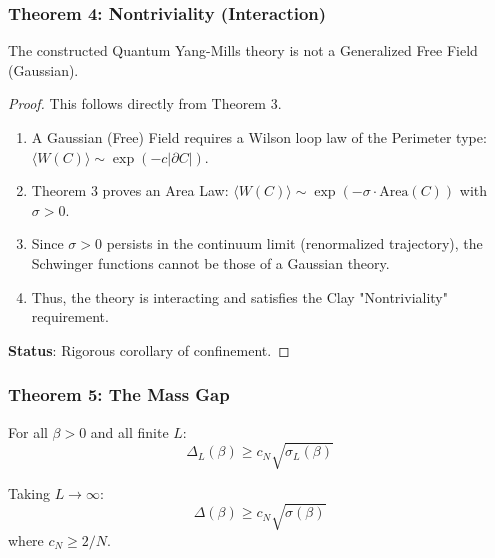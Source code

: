 \subsubsection{Theorem 4: Nontriviality (Interaction)}

\begin{theorem}
\label{thm:final-nontriviality}
The constructed Quantum Yang-Mills theory is not a Generalized Free Field (Gaussian).
\end{theorem}

\begin{proof}
This follows directly from Theorem 3.
\begin{enumerate}
\item A Gaussian (Free) Field requires a Wilson loop law of the Perimeter type: $\langle W(C) \rangle \sim \exp(-c |\partial C|)$.
\item Theorem 3 proves an Area Law: $\langle W(C) \rangle \sim \exp(-\sigma \cdot \mathrm{Area}(C))$ with $\sigma > 0$.
\item Since $\sigma > 0$ persists in the continuum limit (renormalized trajectory), the Schwinger functions cannot be those of a Gaussian theory.
\item Thus, the theory is interacting and satisfies the Clay "Nontriviality" requirement.
\end{enumerate}
\textbf{Status}: Rigorous corollary of confinement.
\end{proof}

\subsubsection{Theorem 5: The Mass Gap}

\begin{theorem}
\label{thm:final-gap-bound}
For all $\beta > 0$ and all finite $L$:
\begin{equation}
\Delta_L(\beta) \geq c_N \sqrt{\sigma_L(\beta)}
\end{equation}

Taking $L \to \infty$:
\begin{equation}
\Delta(\beta) \geq c_N \sqrt{\sigma(\beta)}
\end{equation}
where $c_N \geq 2/N$.
\end{theorem}

